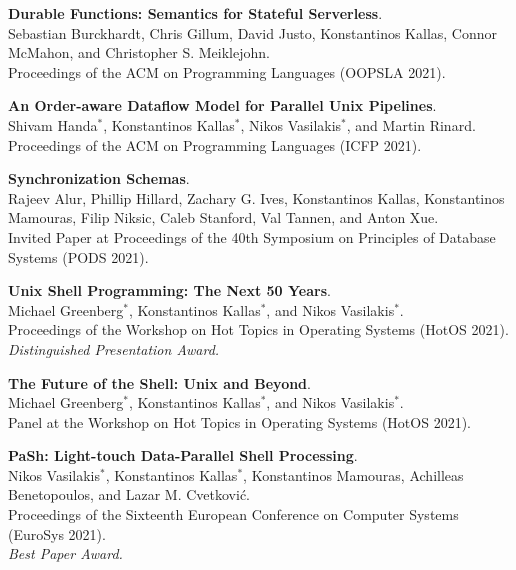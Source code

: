 \begin{minipage}{\textwidth}
\textbf{Durable Functions: Semantics for Stateful Serverless}. \\
Sebastian Burckhardt, Chris Gillum, David Justo, Konstantinos Kallas, Connor McMahon, and Christopher S. Meiklejohn. \\
Proceedings of the ACM on Programming Languages (OOPSLA 2021).
\end{minipage}

\begin{minipage}{\textwidth}
\textbf{An Order-aware Dataflow Model for Parallel Unix Pipelines}. \\
Shivam Handa$^*$, Konstantinos Kallas$^*$, Nikos Vasilakis$^*$, and Martin Rinard. \\
Proceedings of the ACM on Programming Languages (ICFP 2021).
\end{minipage}

\begin{minipage}{\textwidth}
\textbf{Synchronization Schemas}. \\
Rajeev Alur, Phillip Hillard, Zachary G. Ives, Konstantinos Kallas, Konstantinos Mamouras, Filip Niksic, Caleb Stanford, Val Tannen, and Anton Xue. \\
Invited Paper at Proceedings of the 40th Symposium on Principles of Database Systems (PODS 2021).
\end{minipage}

\begin{minipage}{\textwidth}
\textbf{Unix Shell Programming: The Next 50 Years}. \\
Michael Greenberg$^*$, Konstantinos Kallas$^*$, and Nikos Vasilakis$^*$. \\
Proceedings of the Workshop on Hot Topics in Operating Systems (HotOS 2021).\\
 \emph{Distinguished Presentation Award.}
\end{minipage}

\begin{minipage}{\textwidth}
\textbf{The Future of the Shell: Unix and Beyond}. \\
Michael Greenberg$^*$, Konstantinos Kallas$^*$, and Nikos Vasilakis$^*$. \\
Panel at the Workshop on Hot Topics in Operating Systems (HotOS 2021).
\end{minipage}

\begin{minipage}{\textwidth}
\textbf{PaSh: Light-touch Data-Parallel Shell Processing}. \\
Nikos Vasilakis$^*$, Konstantinos Kallas$^*$, Konstantinos Mamouras, Achilleas Benetopoulos, and Lazar M. Cvetković. \\
Proceedings of the Sixteenth European Conference on Computer Systems (EuroSys 2021).\\
 \emph{Best Paper Award.}
\end{minipage}

